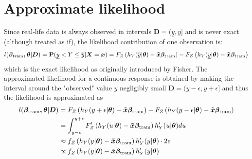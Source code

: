 \documentclass[11pt,a4paper,twoside]{book}\usepackage[]{graphicx}\usepackage[]{xcolor}
\begin{document}

\section{Approximate likelihood}\label{sec:approxlikelihood}
Since real-life data is always observed in intervals $\boldsymbol{D}=(\underline{y},\overline{y}]$ and is never exact (although treated as if), the likelihood contribution of one observation is:
\begin{align*}
l(\boldsymbol{\beta_{\text{tram}},\theta}|\boldsymbol{D})={\mathbf{P}}(\underline{y}< Y\leq \overline{y}|\boldsymbol{X}=\boldsymbol{x})=F_Z\left(h_Y(\overline{y}|\boldsymbol{\theta})-\boldsymbol{\tilde{x}}\boldsymbol{\beta_{\text{tram}}}\right)-F_Z\left(h_Y(\underline{y}|\boldsymbol{\theta})-\boldsymbol{\tilde{x}}\boldsymbol{\beta_{\text{tram}}}\right)
\end{align*}
which is the exact likelihood as originally introduced by Fisher. The approximated likelihood for a continuous response is obtained by making the interval around the "observed" value $y$ negligibly small $\boldsymbol{D}=(y-\epsilon,y+\epsilon]$ and thus the likelihood is approximated as
\begin{align*}
l(\boldsymbol{\beta_{\text{tram}},\theta}|\boldsymbol{D})&=F_Z\left(h_Y(y+\epsilon|\boldsymbol{\theta})-\boldsymbol{\tilde{x}}\boldsymbol{\beta_{\text{tram}}}\right)-F_Z\left(h_Y(y-\epsilon|\boldsymbol{\theta})-\boldsymbol{\tilde{x}}\boldsymbol{\beta_{\text{tram}}}\right)\\
&=\int_{y-\epsilon}^{y+\epsilon}F_Z'\left(h_Y(u|\boldsymbol{\theta})-\boldsymbol{\tilde{x}}\boldsymbol{\beta_{\text{tram}}}\right)h_Y'(u|\boldsymbol{\theta})du\\
&\approx f_Z\left(h_Y(y|\boldsymbol{\theta})-\boldsymbol{\tilde{x}}\boldsymbol{\beta_{\text{tram}}}\right)h_Y'(y|\boldsymbol{\theta})\cdot 2\epsilon\\
&\propto f_Z\left(h_Y(y|\boldsymbol{\theta})-\boldsymbol{\tilde{x}}\boldsymbol{\beta_{\text{tram}}}\right)h_Y'(y|\boldsymbol{\theta})
\end{align*}
\end{document}
